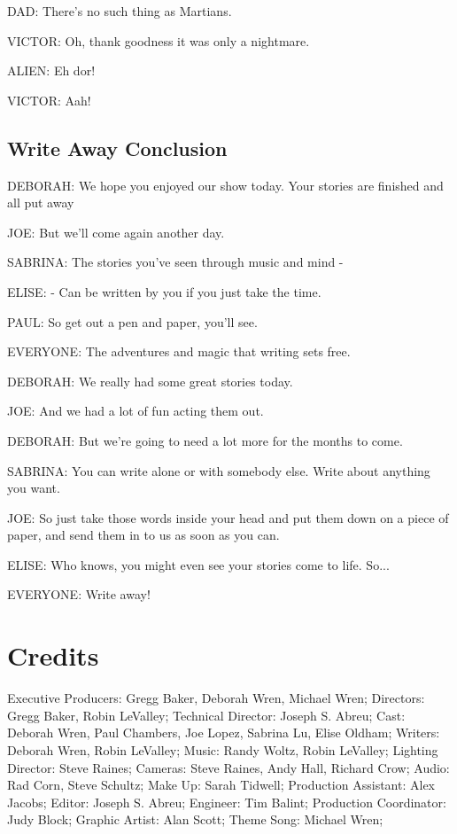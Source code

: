 DAD:
There's no such thing as Martians.

VICTOR:
Oh, thank goodness it was only a nightmare.

ALIEN:
Eh dor!

VICTOR:
Aah!

\subsection{Write Away Conclusion}
DEBORAH:
We hope you enjoyed our show today.
Your stories are finished and all put away

JOE:
But we'll come again another day.

SABRINA:
The stories you've seen through music and mind -

ELISE:
- Can be written by you if you just take the time.

PAUL:
So get out a pen and paper, you'll see.

EVERYONE:
The adventures and magic that writing sets free.

DEBORAH:
We really had some great stories today.

JOE:
And we had a lot of fun acting them out.

DEBORAH:
But we're going to need a lot more for the months to come.

SABRINA:
You can write alone or with somebody else. Write about anything you want.

JOE:
So just take those words inside your head and put them down on a piece of paper, and send them in to us as soon as you can.

ELISE:
Who knows, you might even see your stories come to life. So...

EVERYONE:
Write away!

\section{Credits}

Executive Producers: Gregg Baker, Deborah Wren, Michael Wren;
Directors: Gregg Baker, Robin LeValley;
Technical Director: Joseph S. Abreu;
Cast: Deborah Wren, Paul Chambers, Joe Lopez, Sabrina Lu, Elise Oldham;
Writers: Deborah Wren, Robin LeValley;
Music: Randy Woltz, Robin LeValley;
Lighting Director: Steve Raines;
Cameras: Steve Raines, Andy Hall, Richard Crow;
Audio: Rad Corn, Steve Schultz;
Make Up: Sarah Tidwell;
Production Assistant: Alex Jacobs;
Editor: Joseph S. Abreu;
Engineer: Tim Balint;
Production Coordinator: Judy Block;
Graphic Artist: Alan Scott;
Theme Song: Michael Wren;

